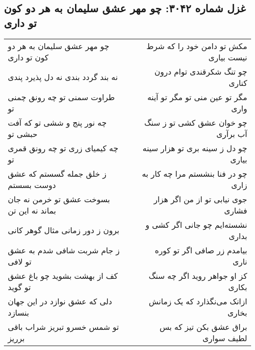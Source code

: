 \begin{center}
\section*{غزل شماره ۳۰۴۲: چو مهر عشق سلیمان به هر دو کون تو داری}
\label{sec:3042}
\begin{longtable}{l p{0.5cm} r}
چو مهر عشق سلیمان به هر دو کون تو داری
&&
مکش تو دامن خود را که شرط نیست بیاری
\\
نه بند گردد بندی نه دل پذیرد پندی
&&
چو تنگ شکرقندی توام درون کناری
\\
طراوت سمنی تو چه رونق چمنی تو
&&
مگر تو عین منی تو مگر تو آینه واری
\\
چه نور پنج و ششی تو که آفت حبشی تو
&&
چو خوان عشق کشی تو ز سنگ آب برآری
\\
چه کیمیای زری تو چه رونق قمری تو
&&
چو دل ز سینه بری تو هزار سینه بیاری
\\
ز خلق جمله گسستم که عشق دوست بسستم
&&
چو در فنا بنشستم مرا چه کار به زاری
\\
بسوخت عشق تو خرمن نه جان بماند نه این تن
&&
جوی نیابی تو از من اگر هزار فشاری
\\
برون ز دور زمانی مثال گوهر کانی
&&
نشسته‌ایم چو جانی اگر کشی و بداری
\\
ز جام شربت شافی شدم به عشق تو لافی
&&
بیامدم زر صافی اگر تو کوره ناری
\\
کف از بهشت بشوید چو باغ عشق تو گوید
&&
کز او جواهر روید اگر چه سنگ بکاری
\\
دلی که عشق نوازد در این جهان بنسازد
&&
ازانک می‌نگذارد که یک زمانش بخاری
\\
تو شمس خسرو تبریز شراب باقی برریز
&&
براق عشق بکن تیز که بس لطیف سواری
\\
\end{longtable}
\end{center}
